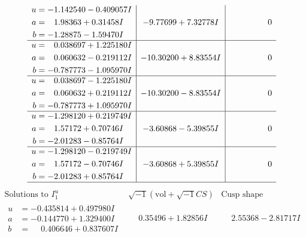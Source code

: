 \documentclass[1p]{elsarticle_modified}
\theoremstyle{definition}
\newcommand{\I}{\sqrt{-1}}
\begin{document}
$$\begin{array}{c|c|c}
\begin{aligned}
u &= -1.142540 - 0.409057 I \\
a &= \phantom{-}1.98363 + 0.31458 I \\
b &= -1.28875 - 1.59470 I\end{aligned}
 & -9.77699 + 7.32778 I & \phantom{-0.000000 } 0 \\ \hline\begin{aligned}
u &= \phantom{-}0.038697 + 1.225180 I \\
a &= \phantom{-}0.060632 - 0.219112 I \\
b &= -0.787773 - 1.095970 I\end{aligned}
 & -10.30200 + 8.83554 I & \phantom{-0.000000 } 0 \\ \hline\begin{aligned}
u &= \phantom{-}0.038697 - 1.225180 I \\
a &= \phantom{-}0.060632 + 0.219112 I \\
b &= -0.787773 + 1.095970 I\end{aligned}
 & -10.30200 - 8.83554 I & \phantom{-0.000000 } 0 \\ \hline\begin{aligned}
u &= -1.298120 + 0.219749 I \\
a &= \phantom{-}1.57172 + 0.70746 I \\
b &= -2.01283 - 0.85764 I\end{aligned}
 & -3.60868 - 5.39855 I & \phantom{-0.000000 } 0 \\ \hline\begin{aligned}
u &= -1.298120 - 0.219749 I \\
a &= \phantom{-}1.57172 - 0.70746 I \\
b &= -2.01283 + 0.85764 I\end{aligned}
 & -3.60868 + 5.39855 I & \phantom{-0.000000 } 0\\
 \hline 
 \end{array}$$\newpage$$\begin{array}{c|c|c}  
\text{Solutions to }I^u_{1}& \I (\text{vol} + \sqrt{-1}CS) & \text{Cusp shape}\\
 \hline 
\begin{aligned}
u &= -0.435814 + 0.497980 I \\
a &= -0.144770 + 1.329400 I \\
b &= \phantom{-}0.406646 + 0.837607 I\end{aligned}
 & \phantom{-}0.35496 + 1.82856 I & \phantom{-}2.55368 - 2.81717 I \\ \hline\begin{aligned}

\end{aligned}
\end{array}$$
\end{document}
